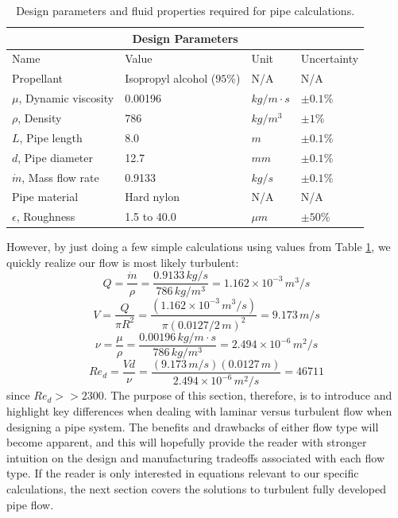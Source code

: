 \documentclass[9pt]{article} %
\numberwithin{equation}{section} %
\begin{document}
\begin{multicols}{2}
\begin{table}[!htb]
\centering
\begin{tabular}{ |p{4cm}||p{4cm}|p{2cm}|p{2cm}|  }
\hline
\multicolumn{4}{|c|}{Design Parameters} \\
\hline
Name & Value & Unit & Uncertainty \\
\hline
Propellant  &  Isopropyl alcohol ($95\%$)   &  N/A  &  N/A \\
$\mu$, Dynamic viscosity  &  0.00196  &  $kg/m \cdot s$  &  $\pm 0.1 \%$ \\
$\rho$, Density  &  786  &  $kg/m^{3}$  &  $\pm 1 \%$ \\
$L$, Pipe length  &  8.0  &  $m$  &  $\pm 0.1 \%$  \\
$d$, Pipe diameter  &  12.7  &  $mm$  &   $\pm 0.1 \%$ \\
$\dot{m}$, Mass flow rate  &  0.9133  &  $kg/s$  &   $\pm 0.1 \%$ \\
Pipe material  &  Hard nylon  &  N/A  &  N/A \\
$\epsilon$, Roughness  &  1.5 to 40.0  &  $\mu m$  &  $\pm 50 \%$ \\
\hline
\end{tabular}
\caption{Design parameters and fluid properties required for pipe calculations.}
\label{table:parameters}
\end{table}
However, by just doing a few simple calculations using values from Table \ref{table:parameters}, we quickly realize our flow is most likely turbulent:
\begin{equation}
Q = \frac{\dot{m}}{\rho} = \frac{0.9133\, kg/s}{786\, kg/m^{3}} = 1.162 \times 10^{-3}\, m^{3}/s
\end{equation}
\begin{equation}
V = \frac{Q}{\pi R^{2}} = \frac{(1.162 \times 10^{-3}\, m^{3}/s)}{\pi (0.0127 / 2\, m)^{2}} = 9.173\, m/s
\end{equation}
\begin{equation}
\nu = \frac{\mu}{\rho} = \frac{0.00196\, kg/m \cdot s}{786\, kg/m^{3}} = 2.494 \times 10^{-6}\, m^{2}/s
\end{equation}
\begin{equation}
Re_{d} = \frac{V d}{\nu} = \frac{(9.173\, m/s)(0.0127\, m)}{2.494 \times 10^{-6}\, m^{2}/s} = 46711
\end{equation}
since $Re_{d} >> 2300$. The purpose of this section, therefore, is to introduce and highlight key differences when dealing with laminar versus turbulent flow when designing a pipe system. The benefits and drawbacks of either flow type will become apparent, and this will hopefully provide the reader with stronger intuition on the design and manufacturing tradeoffs associated with each flow type. If the reader is only interested in equations relevant to our specific calculations, the next section covers the solutions to turbulent fully developed pipe flow.


\end{multicols}
\end{document}
